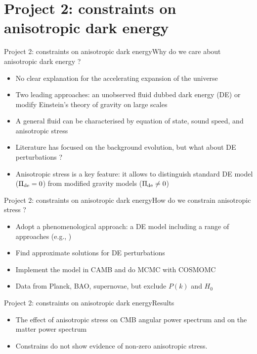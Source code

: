 \documentclass{beamer}
\begin{document}


\section*{Project 2: constraints on anisotropic dark energy}

\begin{frame}{Project 2: constraints on anisotropic dark energy}{Why do we care about anisotropic dark energy ?}
\begin{itemize}
\item No clear explanation for the accelerating expansion of the universe
\item Two leading approaches: an unobserved fluid dubbed dark energy (DE) or modify Einstein's theory of gravity on large scales
\item A general fluid can be characterised by equation of state, sound speed, and anisotropic stress
\item Literature has focused on the background evolution, but what about DE perturbations ?  
\item Anisotropic stress is a key feature: it allows to distinguish standard DE model ($\Pi_{\rm de} = 0$) from modified gravity models ($\Pi_{\rm de}\neq 0$)
\end{itemize}
\end{frame}

\begin{frame}{Project 2: constraints on anisotropic dark energy}{How do we constrain anisotropic stress ?}
\begin{itemize}
\item Adopt a phenomenological approach: a DE model including a range of approaches (e.g., )
\item Find approximate solutions for DE perturbations
\item Implement the model in CAMB and do MCMC with COSMOMC 
\item Data from Planck, BAO, supernovae, but exclude $P(k)$ and $H_0$
\end{itemize}
\end{frame}

\begin{frame}{Project 2: constraints on anisotropic dark energy}{Results}
\begin{itemize}
\item The effect of anisotropic stress on CMB angular power spectrum and on the matter power spectrum
\item Constrains do not show evidence of non-zero anisotropic stress. 
\end{itemize}
\end{frame}
\end{document}
